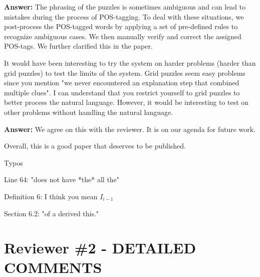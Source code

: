 \documentclass{article}
\newcommand\comment[1]{\marginpar{\tiny #1}}
\renewcommand\comment[1]{#1}
\newcommand{\tias}[1]{{\comment{\color{blue}\textsc{TG:}#1}}}
\newcommand{\emilio}[1]{{\comment{\color{red} \textsc{EG:}#1}}}
\newcommand{\answer}[1]{{\comment{\textbf{Answer:} #1}}}
\newcommand{\new}[1]{{\comment{{\color{blue} #1}}}}
\begin{document}
\answer{The phrasing of the puzzles is sometimes ambiguous and can lead to mistakes during the process of POS-tagging. To deal with these situations, we post-process the POS-tagged words by applying a set of pre-defined rules to recognize ambiguous cases. We then manually verify and correct the assigned POS-tags. We further clarified this in the paper.}

\begin{quoteit}
It would have been interesting to try the system on harder problems (harder than grid puzzles) to test the limits of the system.  Grid puzzles seem easy problems since you mention "we never encountered an explanation step that combined multiple clues".  I can understand that you restrict yourself to grid puzzles to better process the natural language. However, it would be interesting to test on other problems without handling the natural language.
\end{quoteit}

\answer{We agree on this with the reviewer. It is on our agenda for future work.}

\begin{quoteit}
Overall, this is a good paper that deserves to be published. 

Typos

Line 64: "does not have *the* all the"

Definition 6: I think you mean $I_{i-1}
$

Section 6.2: "of a derived this."
\end{quoteit}


\section*{Reviewer \#2 - DETAILED COMMENTS}
\end{document}
